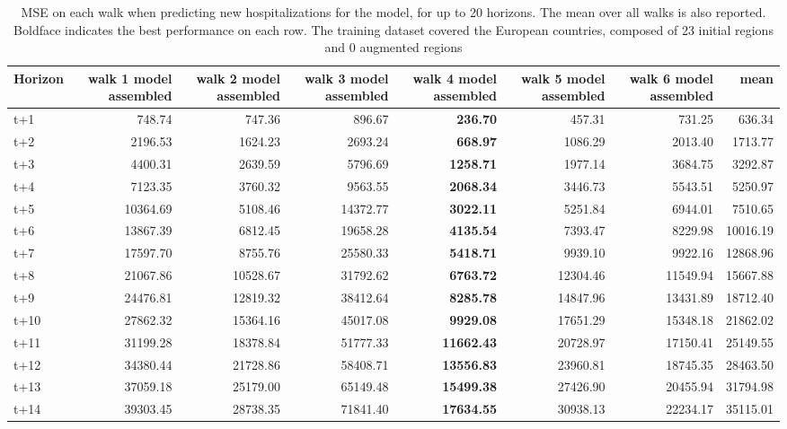 \begin{table}[H]
\centering
\caption{MSE on each walk when predicting new hospitalizations for the model, for up to 20 horizons. The mean over all walks is also reported. Boldface indicates the best performance on each row. The training dataset covered the European countries, composed of 23 initial regions and 0 augmented regions }
\label{tab:MSE_walk_assembly}
\begin{tabular}{lrrrrrrr}
\toprule
Horizon &  walk 1 model assembled &  walk 2 model assembled &  walk 3 model assembled &  walk 4 model assembled &  walk 5 model assembled &  walk 6 model assembled &     mean \\
\midrule
t+1  & 748.74  & 747.36  & 896.67  & \textbf{236.70}  & 457.31  & 731.25  & 636.34  \\
t+2  & 2196.53  & 1624.23  & 2693.24  & \textbf{668.97}  & 1086.29  & 2013.40  & 1713.77  \\
t+3  & 4400.31  & 2639.59  & 5796.69  & \textbf{1258.71}  & 1977.14  & 3684.75  & 3292.87  \\
t+4  & 7123.35  & 3760.32  & 9563.55  & \textbf{2068.34}  & 3446.73  & 5543.51  & 5250.97  \\
t+5  & 10364.69  & 5108.46  & 14372.77  & \textbf{3022.11}  & 5251.84  & 6944.01  & 7510.65  \\
t+6  & 13867.39  & 6812.45  & 19658.28  & \textbf{4135.54}  & 7393.47  & 8229.98  & 10016.19  \\
t+7  & 17597.70  & 8755.76  & 25580.33  & \textbf{5418.71}  & 9939.10  & 9922.16  & 12868.96  \\
t+8  & 21067.86  & 10528.67  & 31792.62  & \textbf{6763.72}  & 12304.46  & 11549.94  & 15667.88  \\
t+9  & 24476.81  & 12819.32  & 38412.64  & \textbf{8285.78}  & 14847.96  & 13431.89  & 18712.40  \\
t+10  & 27862.32  & 15364.16  & 45017.08  & \textbf{9929.08}  & 17651.29  & 15348.18  & 21862.02  \\
t+11  & 31199.28  & 18378.84  & 51777.33  & \textbf{11662.43}  & 20728.97  & 17150.41  & 25149.55  \\
t+12  & 34380.44  & 21728.86  & 58408.71  & \textbf{13556.83}  & 23960.81  & 18745.35  & 28463.50  \\
t+13  & 37059.18  & 25179.00  & 65149.48  & \textbf{15499.38}  & 27426.90  & 20455.94  & 31794.98  \\
t+14  & 39303.45  & 28738.35  & 71841.40  & \textbf{17634.55}  & 30938.13  & 22234.17  & 35115.01  \\

\end{tabular}
\end{table}
